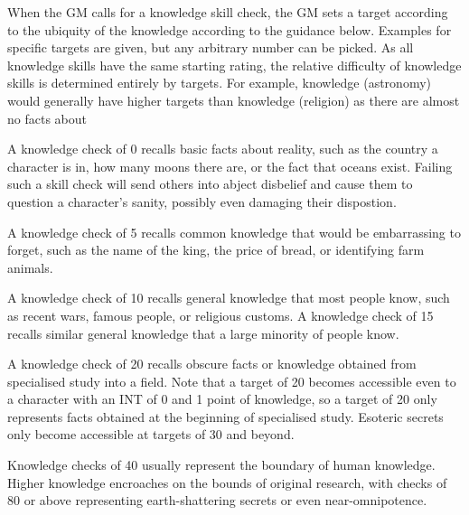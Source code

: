 When the GM calls for a knowledge skill check, the GM sets a target according
to the ubiquity of the knowledge according to the guidance below. Examples
for specific targets are given, but any arbitrary number can be picked. As
all knowledge skills have the same starting rating, the relative difficulty
of knowledge skills is determined entirely by targets. For example, knowledge
(astronomy) would generally have higher targets than knowledge (religion) as
there are almost no facts about

A knowledge check of 0 recalls basic facts about reality, such as the country
a character is in, how many moons there are, or the fact that oceans exist.
Failing such a skill check will send others into abject disbelief and cause
them to question a character's sanity, possibly even damaging their dispostion.

A knowledge check of 5 recalls common knowledge that would be embarrassing to
forget, such as the name of the king, the price of bread, or identifying farm
animals.

A knowledge check of 10 recalls general knowledge that most people know, such
as recent wars, famous people, or religious customs. A knowledge check of 15
recalls similar general knowledge that a large minority of people know.

A knowledge check of 20 recalls obscure facts or knowledge obtained
from specialised study into a field. Note that a target of 20 becomes
accessible even to a character with an INT of 0 and 1 point of knowledge, so
a target of 20 only represents facts obtained at the beginning of specialised
study. Esoteric secrets only become accessible at targets of 30 and beyond.

Knowledge checks of 40 usually represent the boundary of human knowledge.
Higher knowledge encroaches on the bounds of original research, with checks
of 80 or above representing earth-shattering secrets or even near-omnipotence.

